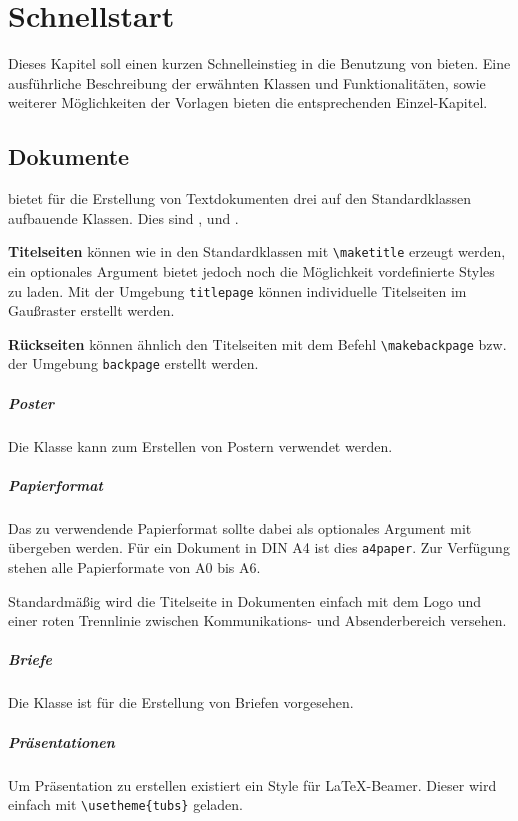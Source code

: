 \chapter{Schnellstart}\label{chap:rapid}

Dieses Kapitel soll einen kurzen Schnelleinstieg in die Benutzung von
\tubslatex bieten. Eine ausführliche Beschreibung der erwähnten
Klassen und Funktionalitäten, sowie weiterer Möglichkeiten der Vorlagen
bieten die entsprechenden Einzel-Kapitel.

\section{Dokumente}
\tubslatex bietet für die Erstellung von Textdokumenten drei auf den
Standardklassen aufbauende Klassen. Dies sind ,
 und .

\textbf{Titelseiten} können wie in den Standardklassen mit \lstinline{\maketitle}
erzeugt werden, ein optionales Argument bietet jedoch noch die Möglichkeit
vordefinierte Styles zu laden.
Mit der Umgebung \lstinline{titlepage} können individuelle Titelseiten
im Gaußraster erstellt werden.

\textbf{Rückseiten} können ähnlich den Titelseiten mit dem Befehl
\lstinline{\makebackpage} bzw. der Umgebung \lstinline{backpage} erstellt werden.



\paragraph{Poster}
Die Klasse  kann zum Erstellen von Postern verwendet werden.

\paragraph{Papierformat}
Das zu verwendende Papierformat sollte dabei als optionales Argument mit
übergeben werden. Für ein Dokument in DIN A4 ist dies \texttt{a4paper}.
Zur Verfügung stehen alle Papierformate von A0 bis A6.

Standardmäßig wird die Titelseite in Dokumenten einfach mit dem Logo und einer
roten Trennlinie zwischen Kommunikations- und Absenderbereich versehen.

\paragraph{Briefe}

Die Klasse  ist für die Erstellung von Briefen
vorgesehen.

\paragraph{Präsentationen}
Um Präsentation zu erstellen existiert ein Style für \LaTeX-Beamer.
Dieser wird einfach mit \lstinline!\usetheme{tubs}! geladen.
